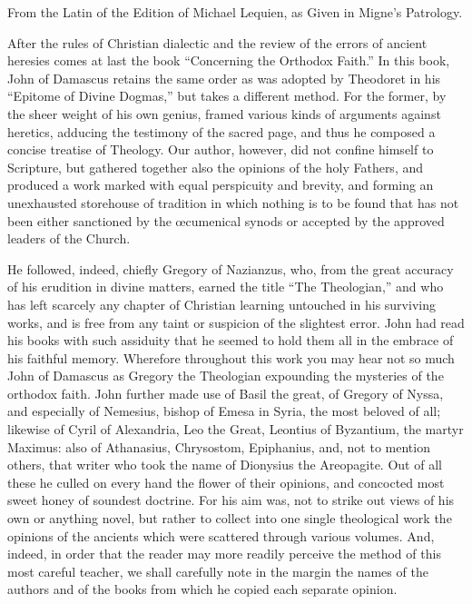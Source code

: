 
From the Latin of the Edition of Michael Lequien, as Given in Migne’s Patrology.

After the rules of Christian dialectic and the review of the errors of ancient heresies comes at last the book “Concerning the Orthodox Faith.” In this book, John of Damascus retains the same order as was adopted by Theodoret in his “Epitome of Divine Dogmas,” but takes a different method. For the former, by the sheer weight of his own genius, framed various kinds of arguments against heretics, adducing the testimony of the sacred page, and thus he composed a concise treatise of Theology. Our author, however, did not confine himself to Scripture, but gathered together also the opinions of the holy Fathers, and produced a work marked with equal perspicuity and brevity, and forming an unexhausted storehouse of tradition in which nothing is to be found that has not been either sanctioned by the œcumenical synods or accepted by the approved leaders of the Church.

He followed, indeed, chiefly Gregory of Nazianzus, who, from the great accuracy of his erudition in divine matters, earned the title “The Theologian,” and who has left scarcely any chapter of Christian learning untouched in his surviving works, and is free from any taint or suspicion of the slightest error. John had read his books with such assiduity that he seemed to hold them all in the embrace of his faithful memory. Wherefore throughout this work you may hear not so much John of Damascus as Gregory the Theologian expounding the mysteries of the orthodox faith. John further made use of Basil the great, of Gregory of Nyssa, and especially of Nemesius, bishop of Emesa in Syria, the most beloved of all; likewise of Cyril of Alexandria, Leo the Great, Leontius of Byzantium, the martyr Maximus: also of Athanasius, Chrysostom, Epiphanius, and, not to mention others, that writer who took the name of Dionysius the Areopagite. Out of all these he culled on every hand the flower of their opinions, and concocted most sweet honey of soundest doctrine. For his aim was, not to strike out views of his own or anything novel, but rather to collect into one single theological work the opinions of the ancients which were scattered through various volumes. And, indeed, in order that the reader may more readily perceive the method of this most careful teacher, we shall carefully note in the margin the names of the authors and of the books from which he copied each separate opinion.


